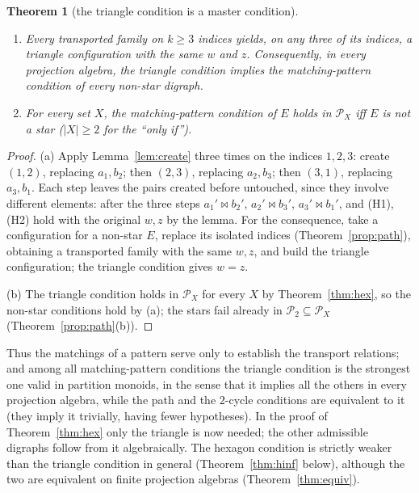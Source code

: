 \documentclass[11pt]{amsart}
\newtheorem{theorem}{Theorem}[section]
\theoremstyle{definition}
\renewcommand{\P}{\mathcal{P}}
\begin{document}
\begin{theorem}[the triangle condition is a master condition]\label{thm:master}
\begin{enumerate}[label=\textup{(\alph*)}]
\item Every transported family on $k\ge3$ indices yields, on any three of its indices, a triangle configuration with the same $w$ and $z$. Consequently, in \emph{every} projection algebra, the triangle condition implies the matching-pattern condition of every non-star digraph.
\item For every set $X$, the matching-pattern condition of $E$ holds in $\P_X$ iff $E$ is not a star ($|X|\ge2$ for the ``only if'').
\end{enumerate}
\end{theorem}
\begin{proof}
(a) Apply Lemma~\ref{lem:create} three times on the indices $1,2,3$: create $(1,2)$, replacing $a_1,b_2$; then $(2,3)$, replacing $a_2,b_3$; then $(3,1)$, replacing $a_3,b_1$. Each step leaves the pairs created before untouched, since they involve different elements: after the three steps $a_1'\bowtie b_2'$, $a_2'\bowtie b_3'$, $a_3'\bowtie b_1'$, and (H1), (H2) hold with the original $w,z$ by the lemma. For the consequence, take a configuration for a non-star $E$, replace its isolated indices (Theorem~\ref{prop:path}), obtaining a transported family with the same $w,z$, and build the triangle configuration; the triangle condition gives $w=z$.

(b) The triangle condition holds in $\P_X$ for every $X$ by Theorem~\ref{thm:hex}, so the non-star conditions hold by (a); the stars fail already in $\P_2\subseteq\P_X$ (Theorem~\ref{prop:path}(b)).
\end{proof}

Thus the matchings of a pattern serve only to establish the transport relations; and among all matching-pattern conditions the triangle condition is the strongest one valid in partition monoids, in the sense that it implies all the others in every projection algebra, while the path and the $2$-cycle conditions are equivalent to it (they imply it trivially, having fewer hypotheses). In the proof of Theorem~\ref{thm:hex} only the triangle is now needed; the other admissible digraphs follow from it algebraically. The hexagon condition is strictly weaker than the triangle condition in general (Theorem~\ref{thm:hinf} below), although the two are equivalent on finite projection algebras (Theorem~\ref{thm:equiv}).
\end{document}
